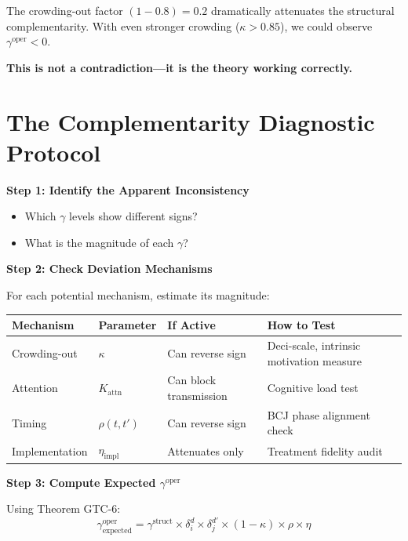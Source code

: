 The crowding-out factor $(1 - 0.8) = 0.2$ dramatically attenuates the
structural complementarity. With even stronger crowding ($\kappa > 0.85$),
we could observe $\gamma^{\text{oper}} < 0$.

\textbf{This is not a contradiction---it is the theory working correctly.}

\section{The Complementarity Diagnostic Protocol}
\label{sec:gtc-diagnostic}

\begin{tcolorbox}[colback=yellow!5!white, colframe=yellow!75!black,
    title=Diagnostic Protocol: When $\gamma$ Values Seem Inconsistent]

\textbf{Step 1: Identify the Apparent Inconsistency}
\begin{itemize}[nosep]
    \item Which $\gamma$ levels show different signs?
    \item What is the magnitude of each $\gamma$?
\end{itemize}

\textbf{Step 2: Check Deviation Mechanisms}

For each potential mechanism, estimate its magnitude:

\begin{center}
\renewcommand{\arraystretch}{1.3}
\begin{tabular}{llll}
\textbf{Mechanism} & \textbf{Parameter} & \textbf{If Active} & \textbf{How to Test} \\
\hline
Crowding-out & $\kappa$ & Can reverse sign & Deci-scale, intrinsic motivation measure \\
Attention & $K_{\text{attn}}$ & Can block transmission & Cognitive load test \\
Timing & $\rho(t,t')$ & Can reverse sign & BCJ phase alignment check \\
Implementation & $\eta_{\text{impl}}$ & Attenuates only & Treatment fidelity audit \\
\end{tabular}
\end{center}

\textbf{Step 3: Compute Expected $\gamma^{\text{oper}}$}

Using Theorem GTC-6:
\begin{equation}
\gamma^{\text{oper}}_{\text{expected}} = \gamma^{\text{struct}} \times \delta_i^d \times \delta_j^{d'} \times (1-\kappa) \times \rho \times \eta
\end{equation}


\end{tcolorbox}
